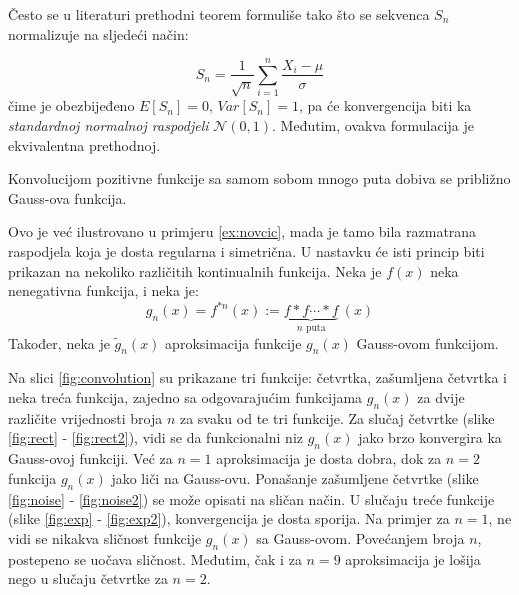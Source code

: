 Često se u literaturi prethodni teorem formuliše tako što se sekvenca $S_n$
normalizuje na sljedeći način:

$$S_n = \frac{1}{\sqrt{n}} \sum_{i=1}^{n} \frac{X_i-\mu}{\sigma}$$
čime je obezbijeđeno $E[S_n] = 0$, $Var[S_n] = 1$, pa će konvergencija biti
ka \textit{standardnoj normalnoj raspodjeli} $\mathcal{N}(0,1)$.
Međutim, ovakva formulacija je ekvivalentna prethodnoj.

\begin{corollary}
  Konvolucijom pozitivne funkcije sa samom sobom mnogo puta dobiva se približno
  Gauss-ova funkcija.
\end{corollary}
Ovo je već ilustrovano u primjeru \ref{ex:novcic}, mada je tamo bila razmatrana
raspodjela koja je dosta regularna i simetrična. U nastavku će isti princip biti
prikazan na nekoliko različitih kontinualnih funkcija. Neka je $f(x)$ neka
nenegativna funkcija, i neka je:
\begin{equation}
  g_n(x) = f^{*n}(x) := \underbrace{f*f\cdots*f}_{n\text{ puta}}\ (x)
\end{equation}
Također, neka je $\widetilde{g}_n(x)$ aproksimacija funkcije $g_n(x)$ Gauss-ovom
funkcijom.

Na slici \ref{fig:convolution} su prikazane tri funkcije: četvrtka, zašumljena
četvrtka i neka treća funkcija, zajedno sa odgovarajućim funkcijama $g_n(x)$ za
dvije različite vrijednosti broja $n$ za svaku od te tri funkcije. Za slučaj
četvrtke (slike \ref{fig:rect} - \ref{fig:rect2}), vidi se da funkcionalni niz
$g_n(x)$ jako brzo konvergira ka Gauss-ovoj funkciji. Već za $n=1$ aproksimacija
je dosta dobra, dok za $n=2$ funkcija $g_n(x)$ jako liči na Gauss-ovu. Ponašanje
zašumljene četvrtke (slike \ref{fig:noise} - \ref{fig:noise2}) se može opisati
na sličan način. U slučaju treće funkcije (slike \ref{fig:exp} -
\ref{fig:exp2}), konvergencija je dosta sporija. Na primjer za $n=1$, ne vidi se
nikakva sličnost funkcije $g_n(x)$ sa Gauss-ovom.  Povećanjem broja $n$,
postepeno se uočava sličnost. Međutim, čak i za $n=9$ aproksimacija je lošija
nego u slučaju četvrtke za $n=2$.

